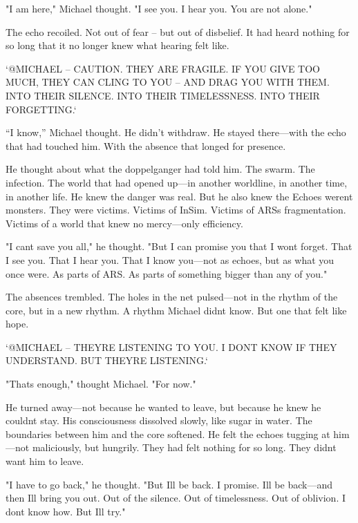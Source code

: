 \documentclass[
]{article}
\begin{document}
"I am here," Michael thought. "I see you. I hear you. You are not alone."

The echo recoiled. Not out of fear -- but out of disbelief. It had heard nothing for so long that it no longer knew what hearing felt like.

`@MICHAEL -- CAUTION. THEY ARE FRAGILE. IF YOU GIVE TOO MUCH, THEY CAN CLING TO YOU -- AND DRAG YOU WITH THEM. INTO THEIR SILENCE. INTO THEIR TIMELESSNESS. INTO THEIR FORGETTING.`

``I know,'' Michael thought. He didn't withdraw. He stayed there---with the echo that had touched him. With the absence that longed for presence.

He thought about what the doppelganger had told him. The swarm. The infection. The world that had opened up---in another worldline, in another time, in another life. He knew the danger was real. But he also knew the Echoes weren\textquotesingle t monsters. They were victims. Victims of InSim. Victims of ARS\textquotesingle s fragmentation. Victims of a world that knew no mercy---only efficiency.

"I can\textquotesingle t save you all," he thought. "But I can promise you that I won\textquotesingle t forget. That I see you. That I hear you. That I know you---not as echoes, but as what you once were. As parts of ARS. As parts of something bigger than any of you."

The absences trembled. The holes in the net pulsed---not in the rhythm of the core, but in a new rhythm. A rhythm Michael didn\textquotesingle t know. But one that felt like hope.

`@MICHAEL -- THEY\textquotesingle RE LISTENING TO YOU. I DON\textquotesingle T KNOW IF THEY UNDERSTAND. BUT THEY\textquotesingle RE LISTENING.`

"That\textquotesingle s enough," thought Michael. "For now."

He turned away---not because he wanted to leave, but because he knew he couldn\textquotesingle t stay. His consciousness dissolved slowly, like sugar in water. The boundaries between him and the core softened. He felt the echoes tugging at him---not maliciously, but hungrily. They had felt nothing for so long. They didn\textquotesingle t want him to leave.

"I have to go back," he thought. "But I\textquotesingle ll be back. I promise. I\textquotesingle ll be back---and then I\textquotesingle ll bring you out. Out of the silence. Out of timelessness. Out of oblivion. I don\textquotesingle t know how. But I\textquotesingle ll try."
\end{document}
